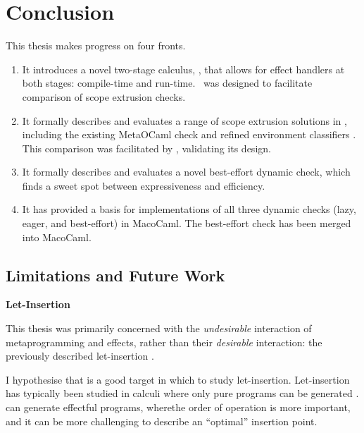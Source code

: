 \chapter{Conclusion}

This thesis makes progress on four fronts. 

\begin{enumerate}
\item It introduces a novel two-stage calculus, \calculusName{}, that allows for effect handlers at both stages: compile-time and run-time.\ \calculusName{} was designed to facilitate comparison of scope extrusion checks.

\item It formally describes and evaluates a range of scope extrusion solutions in \calculusName{}, including the existing MetaOCaml check \citep{kiselyov-14} and refined environment classifiers \citep{kiselyov-16}. This comparison was facilitated by \calculusName{}, validating its design.

\item It formally describes and evaluates a novel best-effort dynamic check, which finds a sweet spot between expressiveness and efficiency.

\item It has provided a basis for implementations of all three dynamic checks (lazy, eager, and best-effort) in MacoCaml. The best-effort check has been merged into MacoCaml.
\end{enumerate}

\section{Limitations and Future Work}
\begin{minipage}[t]{0.25\textwidth}
  \textbf{\textsf{Let-Insertion}}
\end{minipage}%
\begin{minipage}[t]{0.75\textwidth}
  This thesis was primarily concerned with the \textit{undesirable} interaction of metaprogramming and effects, rather than their \textit{desirable} interaction: the previously described let-insertion \citep{yallop-2019}. 
  \vspace{2mm}

  I hypothesise that \calculusName{} is a good target in which to study let-insertion. Let-insertion has typically been studied in calculi where only pure programs can be generated \citep{isoda-24}. \calculusName{} can generate effectful programs, wherethe order of operation is more important, and it can be more challenging to describe an ``optimal'' insertion point.
  \vspace{4mm}
\end{minipage}\\

